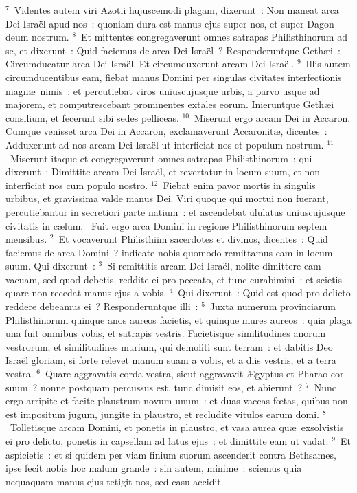 ${}^{7}$~Videntes autem viri Azotii hujuscemodi plagam, dixerunt~: Non maneat arca Dei Isra\"el apud nos~: quoniam dura est manus ejus super nos, et super Dagon deum nostrum.
${}^{8}$~Et mittentes congregaverunt omnes satrapas Philisthinorum ad se, et dixerunt~: Quid faciemus de arca Dei Isra\"el~? Responderuntque Geth\ae i~: Circumducatur arca Dei Isra\"el. Et circumduxerunt arcam Dei Isra\"el.
${}^{9}$~Illis autem circumducentibus eam, fiebat manus Domini per singulas civitates interfectionis magn\ae\ nimis~: et percutiebat viros uniuscujusque urbis, a parvo usque ad majorem, et computrescebant prominentes extales eorum. Inieruntque Geth\ae i consilium, et fecerunt sibi sedes pelliceas.
${}^{10}$~Miserunt ergo arcam Dei in Accaron. Cumque venisset arca Dei in Accaron, exclamaverunt Accaronit\ae , dicentes~: Adduxerunt ad nos arcam Dei Isra\"el ut interficiat nos et populum nostrum.
${}^{11}$~Miserunt itaque et congregaverunt omnes satrapas Philisthinorum~: qui dixerunt~: Dimittite arcam Dei Isra\"el, et revertatur in locum suum, et non interficiat nos cum populo nostro.
${}^{12}$~Fiebat enim pavor mortis in singulis urbibus, et gravissima valde manus Dei. Viri quoque qui mortui non fuerant, percutiebantur in secretiori parte natium~: et ascendebat ululatus uniuscujusque civitatis in c\ae lum.
~Fuit ergo arca Domini in regione Philisthinorum septem mensibus.
${}^{2}$~Et vocaverunt Philisthiim sacerdotes et divinos, dicentes~: Quid faciemus de arca Domini~? indicate nobis quomodo remittamus eam in locum suum. Qui dixerunt~:
${}^{3}$~Si remittitis arcam Dei Isra\"el, nolite dimittere eam vacuam, sed quod debetis, reddite ei pro peccato, et tunc curabimini~: et scietis quare non recedat manus ejus a vobis.
${}^{4}$~Qui dixerunt~: Quid est quod pro delicto reddere debeamus ei~? Responderuntque illi~:
${}^{5}$~Juxta numerum provinciarum Philisthinorum quinque anos aureos facietis, et quinque mures aureos~: quia plaga una fuit omnibus vobis, et satrapis vestris. Facietisque similitudines anorum vestrorum, et similitudines murium, qui demoliti sunt terram~: et dabitis Deo Isra\"el gloriam, si forte relevet manum suam a vobis, et a diis vestris, et a terra vestra.
${}^{6}$~Quare aggravatis corda vestra, sicut aggravavit \AE gyptus et Pharao cor suum~? nonne postquam percussus est, tunc dimisit eos, et abierunt~?
${}^{7}$~Nunc ergo arripite et facite plaustrum novum unum~: et duas vaccas fœtas, quibus non est impositum jugum, jungite in plaustro, et recludite vitulos earum domi.
${}^{8}$~Tolletisque arcam Domini, et ponetis in plaustro, et vasa aurea qu\ae\ exsolvistis ei pro delicto, ponetis in capsellam ad latus ejus~: et dimittite eam ut vadat.
${}^{9}$~Et aspicietis~: et si quidem per viam finium suorum ascenderit contra Bethsames, ipse fecit nobis hoc malum grande~: sin autem, minime~: sciemus quia nequaquam manus ejus tetigit nos, sed casu accidit.


